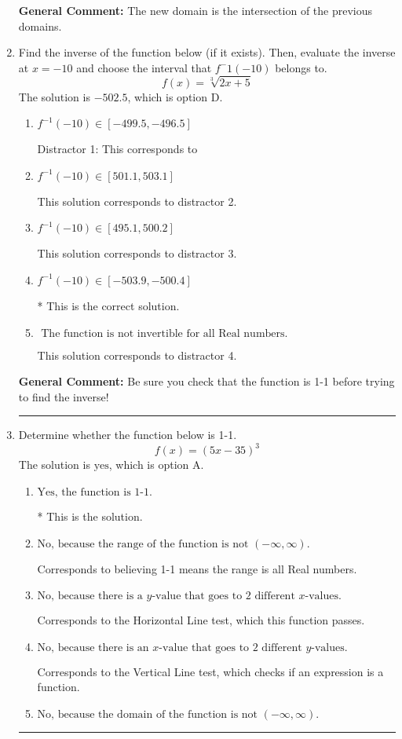 \documentclass{extbook}[14pt]
\newcommand{\litem}[1]{\item #1

\rule{\textwidth}{0.4pt}}
\begin{document}
\begin{enumerate}
{\begin{enumerate}[label=\Alph*.]
\end{enumerate}

\textbf{General Comment:} The new domain is the intersection of the previous domains.
}
\litem{
Find the inverse of the function below (if it exists). Then, evaluate the inverse at $x = -10$ and choose the interval that $f^-1(-10)$ belongs to.
\[ f(x) = \sqrt[3]{2 x + 5} \]The solution is \( -502.5 \), which is option D.\begin{enumerate}[label=\Alph*.]
\item \( f^{-1}(-10) \in [-499.5, -496.5] \)

 Distractor 1: This corresponds to 
\item \( f^{-1}(-10) \in [501.1, 503.1] \)

 This solution corresponds to distractor 2.
\item \( f^{-1}(-10) \in [495.1, 500.2] \)

 This solution corresponds to distractor 3.
\item \( f^{-1}(-10) \in [-503.9, -500.4] \)

* This is the correct solution.
\item \( \text{ The function is not invertible for all Real numbers. } \)

 This solution corresponds to distractor 4.
\end{enumerate}

\textbf{General Comment:} Be sure you check that the function is 1-1 before trying to find the inverse!
}
\litem{
Determine whether the function below is 1-1.
\[ f(x) = (5 x - 35)^3 \]The solution is \( \text{yes} \), which is option A.\begin{enumerate}[label=\Alph*.]
\item \( \text{Yes, the function is 1-1.} \)

* This is the solution.
\item \( \text{No, because the range of the function is not $(-\infty, \infty)$.} \)

Corresponds to believing 1-1 means the range is all Real numbers.
\item \( \text{No, because there is a $y$-value that goes to 2 different $x$-values.} \)

Corresponds to the Horizontal Line test, which this function passes.
\item \( \text{No, because there is an $x$-value that goes to 2 different $y$-values.} \)

Corresponds to the Vertical Line test, which checks if an expression is a function.
\item \( \text{No, because the domain of the function is not $(-\infty, \infty)$.} \)


\end{enumerate}}
\end{enumerate}
\end{document}
